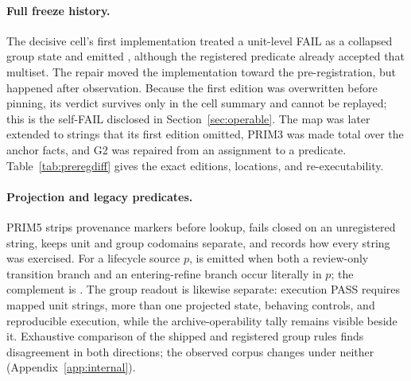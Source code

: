 \documentclass{article}
\begin{document}
\paragraph{Full freeze history.}
The decisive cell's first implementation treated a unit-level FAIL as a collapsed group
state and emitted , although the registered predicate already
accepted that multiset. The repair moved the implementation toward the pre-registration,
but happened after observation. Because the first edition was overwritten before pinning,
its verdict survives only in the cell summary and cannot be replayed; this is the
self-FAIL disclosed in Section~\ref{sec:operable}. The map was later extended to strings
that its first edition omitted, PRIM3 was made total over the anchor facts, and G2 was
repaired from an assignment to a predicate. Table~\ref{tab:preregdiff} gives the exact
editions, locations, and re-executability.

\paragraph{Projection and legacy predicates.}
PRIM5 strips provenance markers before lookup, fails closed on an unregistered string,
keeps unit and group codomains separate, and records how every string was exercised. For a
lifecycle source $p$,  is emitted when both a review-only transition
branch and an entering-refine branch occur literally in $p$; the complement is
. The group readout is likewise separate: execution PASS requires
mapped unit strings, more than one projected state, behaving controls, and reproducible
execution, while the archive-operability tally remains visible beside it. Exhaustive
comparison of the shipped and registered group rules finds disagreement in both directions;
the observed corpus changes under neither (Appendix~\ref{app:internal}).
\end{document}
